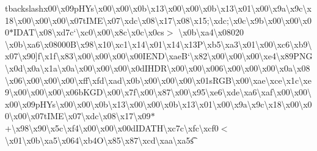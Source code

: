 \begin{DoxyCompactItemize}
tbackslash{}x00\textbackslash{}x09p\+H\+Ys\textbackslash{}x00\textbackslash{}x00\textbackslash{}x0b\textbackslash{}x13\textbackslash{}x00\textbackslash{}x00\textbackslash{}x0b\textbackslash{}x13\textbackslash{}x01\textbackslash{}x00\textbackslash{}x9a\textbackslash{}x9c\textbackslash{}x18\textbackslash{}x00\textbackslash{}x00\textbackslash{}x00\textbackslash{}x07t\+I\+M\+E\textbackslash{}x07\textbackslash{}xdc\textbackslash{}x08\textbackslash{}x17\textbackslash{}x08\textbackslash{}x15;\textbackslash{}xdc;\textbackslash{}x0c\textbackslash{}x9b\textbackslash{}x00\textbackslash{}x00\textbackslash{}x00$\ast$\+I\+D\+A\+T\textbackslash{}x08\textbackslash{}xd7c`\textbackslash{}xc0\textbackslash{}x00\textbackslash{}x8c\textbackslash{}x0c\textbackslash{}x0cs$>$ \textbackslash{}x0b\textbackslash{}xa4\textbackslash{}x08020 \textbackslash{}x0b\textbackslash{}xa6\textbackslash{}x08000\+B\textbackslash{}x98\textbackslash{}x10\textbackslash{}xc1\textbackslash{}x14\textbackslash{}x01\textbackslash{}x14\textbackslash{}x13\+P\textbackslash{}xb5\textbackslash{}xa3\textbackslash{}x01\textbackslash{}x00\textbackslash{}xc6\textbackslash{}xb9\textbackslash{}x07\textbackslash{}x90\mbox{]}f\textbackslash{}x1f\textbackslash{}x83\textbackslash{}x00\textbackslash{}x00\textbackslash{}x00\textbackslash{}x00\+I\+E\+N\+D\textbackslash{}xae\+B`\textbackslash{}x82\textbackslash{}x00\textbackslash{}x00\textbackslash{}x00\textbackslash{}xe4\textbackslash{}x89\+P\+N\+G\textbackslash{}x0d\textbackslash{}x0a\textbackslash{}x1a\textbackslash{}x0a\textbackslash{}x00\textbackslash{}x00\textbackslash{}x00\textbackslash{}x0d\+I\+H\+D\+R\textbackslash{}x00\textbackslash{}x00\textbackslash{}x006\textbackslash{}x00\textbackslash{}x00\textbackslash{}x00\textbackslash{}x0a\textbackslash{}x08\textbackslash{}x06\textbackslash{}x00\textbackslash{}x00\textbackslash{}x00\textbackslash{}xff\textbackslash{}xfd\textbackslash{}xad\textbackslash{}x0b\textbackslash{}x00\textbackslash{}x00\textbackslash{}x00\textbackslash{}x01s\+R\+G\+B\textbackslash{}x00\textbackslash{}xae\textbackslash{}xce\textbackslash{}x1c\textbackslash{}xe9\textbackslash{}x00\textbackslash{}x00\textbackslash{}x00\textbackslash{}x06b\+K\+G\+D\textbackslash{}x00\textbackslash{}x7f\textbackslash{}x00\textbackslash{}x87\textbackslash{}x00\textbackslash{}x95\textbackslash{}xe6\textbackslash{}xde\textbackslash{}xa6\textbackslash{}xaf\textbackslash{}x00\textbackslash{}x00\textbackslash{}x00\textbackslash{}x09p\+H\+Ys\textbackslash{}x00\textbackslash{}x00\textbackslash{}x0b\textbackslash{}x13\textbackslash{}x00\textbackslash{}x00\textbackslash{}x0b\textbackslash{}x13\textbackslash{}x01\textbackslash{}x00\textbackslash{}x9a\textbackslash{}x9c\textbackslash{}x18\textbackslash{}x00\textbackslash{}x00\textbackslash{}x00\textbackslash{}x07t\+I\+M\+E\textbackslash{}x07\textbackslash{}xdc\textbackslash{}x08\textbackslash{}x17\textbackslash{}x09$\ast$+\textbackslash{}x98\textbackslash{}x90\textbackslash{}x5c\textbackslash{}xf4\textbackslash{}x00\textbackslash{}x00\textbackslash{}x00d\+I\+D\+A\+T\+H\textbackslash{}xc7c\textbackslash{}xfc\textbackslash{}xcf0$<$\textbackslash{}x01\textbackslash{}x0b\textbackslash{}xa5\textbackslash{}x064\textbackslash{}xb4\+O\textbackslash{}x85\textbackslash{}x87\textbackslash{}xcd\textbackslash{}xaa\textbackslash{}xa5s\t
\end{DoxyCompactItemize}
